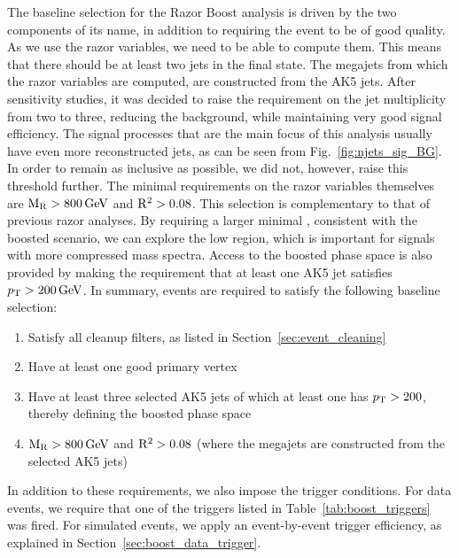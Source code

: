 
The baseline selection for the Razor Boost analysis is driven by the two components of its name, in
addition to requiring the event to be of good quality.
As we use the razor variables, we need to be able to compute them. This means that there should be
at least two jets in the final state. The megajets from which the razor variables are computed, are
constructed from the AK5 jets.  
After sensitivity studies, it was decided to raise the requirement on the jet multiplicity from two
to three, reducing the background, while maintaining very good signal efficiency. The signal
processes that are the main focus of this analysis usually have even more reconstructed jets, as
can be seen from Fig.~\ref{fig:njets_sig_BG}. In order to remain as inclusive as possible, we did
not, however, raise this threshold further.
The minimal requirements on the razor variables themselves are $\mathrm{M_R} > 800\,\text{Ge\hspace{-.08em}V}$ and $\mathrm{R^2} > 0.08$.
This selection is complementary to that of previous razor analyses. By requiring a larger
minimal \mr, consistent with the boosted scenario, we can explore the low \rsq region, which is
important for signals with more compressed mass spectra.
Access to the boosted phase space is also provided by making the requirement that at least one AK5
jet satisfies $p_{\mathrm{T}} > 200\,\text{Ge\hspace{-.08em}V}$.
In summary, events are required to satisfy the following baseline selection:
\begin{enumerate}
 \item Satisfy all cleanup filters, as listed in Section~\ref{sec:event_cleaning}
 \item Have at least one good primary vertex
 \item Have at least three selected AK5 jets of which at least one has  $p_{\mathrm{T}} > 200$\GeV, thereby
 defining the boosted phase space
 \item $\mathrm{M_R} > 800\,\text{Ge\hspace{-.08em}V}$ and $\mathrm{R^2} > 0.08$ (where the megajets are constructed from the selected AK5
jets)
\end{enumerate}
In addition to these requirements, we also impose the trigger conditions. 
For data events, we require that one of the triggers listed in Table~\ref{tab:boost_triggers} was
fired. 
For simulated events, we apply an event-by-event trigger efficiency, as explained in
Section~\ref{sec:boost_data_trigger}. 

